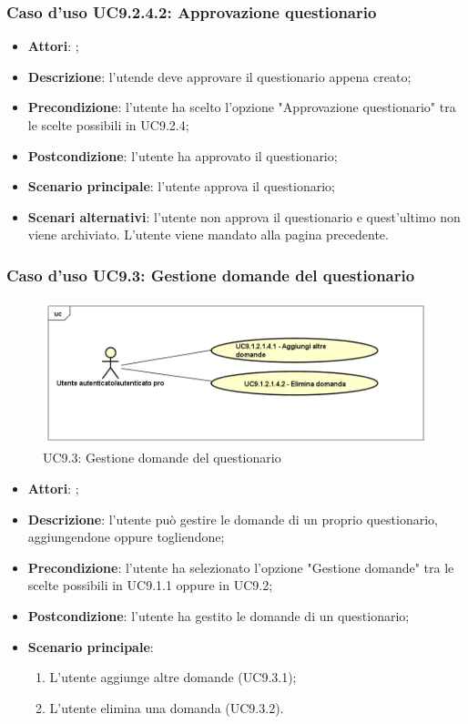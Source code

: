 			\subsubsection{Caso d'uso UC9.2.4.2: Approvazione questionario}
			\label{UC9.2.4.2}
			\begin{itemize}
				\item \textbf{Attori}: \uaupro;
				\item \textbf{Descrizione}: l'utende deve approvare il questionario appena creato;
				\item \textbf{Precondizione}: l'utente ha scelto l'opzione "Approvazione questionario" tra le scelte possibili in UC9.2.4; 
				\item \textbf{Postcondizione}: l'utente ha approvato il questionario;
				\item \textbf{Scenario principale}: l'utente approva il questionario;
				\item \textbf{Scenari alternativi}: l'utente non approva il questionario e quest'ultimo non viene archiviato. L'utente viene mandato alla pagina precedente.
			\end{itemize}				
	 
	 \subsubsection{Caso d'uso UC9.3: Gestione domande del questionario}
	 \label{UC9.3}
	 \begin{figure}[h]
	 	\centering
	 	\includegraphics[scale=0.5,keepaspectratio]{UML/UC9_3.png}
	 	\caption{UC9.3: Gestione domande del questionario}
	 \end{figure}
	 \FloatBarrier
	 \begin{itemize}
	 	\item \textbf{Attori}: \uaupro;
	 	\item \textbf{Descrizione}: l'utente può gestire le domande di un proprio questionario, aggiungendone oppure togliendone;
	 	\item \textbf{Precondizione}: l'utente ha selezionato l'opzione "Gestione domande" tra le scelte possibili in UC9.1.1 oppure in UC9.2;
	 	\item \textbf{Postcondizione}: l'utente ha gestito le domande di un questionario;
	 	\item \textbf{Scenario principale}: 
	 	\begin{enumerate}
	 		\item L'utente aggiunge altre domande (UC9.3.1);
	 		\item L'utente elimina una domanda (UC9.3.2).
	 	\end{enumerate}
	 \end{itemize}
	 
